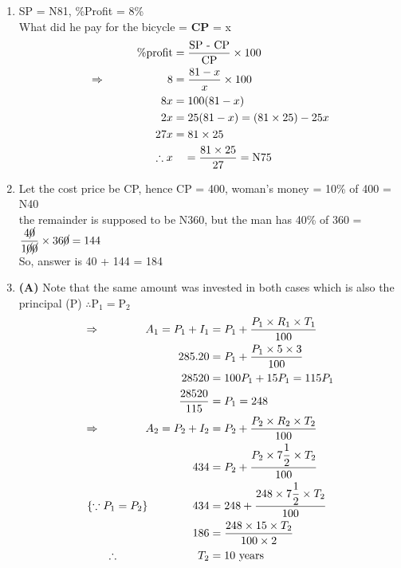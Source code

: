\begin{multicols}{2}
\begin{enumerate}[label={\arabic*.}]
    \item SP = N81, \%Profit = 8\% \\
    What did he pay for the bicycle = \textbf{CP} = x \\
    \begin{align*}
    \%\text{profit} &= \dfrac{ \text{SP - CP}}{\text{CP}} \times 100  \\ 
    \Rightarrow \hspace{55px} 8 &= \dfrac{81 - x }{x} \times 100 \\
     \hspace{50px} 8x &= 100(81 - x)  \\
     \hspace{50px} 2x &= 25(81 - x ) = (81\times25) -25x \\
     \hspace{50px} 27x &= 81\times 25 \\
    \therefore  x &\quad = \dfrac{81 \times 25}{27} = \text{N}75
    \end{align*}

    \item  Let the cost price be CP, hence CP = 400, woman's money = 10\% of 400 = N40 \\
    the remainder is supposed to be N360, but the man has 40\% of 360 = \(\dfrac{4\cancel{0}}{1\cancel{0}\cancel{0}} \times 36\cancel{0} = 144 \) \vspace {5px}\\
    So, answer is 40 + 144 = 184

    \item \textbf{(A)} Note that the same amount was invested in both cases which is also the principal (P) 
    \( \therefore \text{P}_1 = \text{P}_2\)
    \begin{align*} 
        \Rightarrow \hspace{40px} A_1 = P_1 + I_1 &= P_1 + \dfrac{P_1 \times R_1 \times T_1}{100} \\
        285.20&= P_1 + \dfrac{P_1 \times 5 \times 3}{100} \\
         28520 &= 100P_1 + 15P_1 = 115P_1 \\
         \dfrac{28520}{115}&= P_1 = 248 \\
        \Rightarrow \hspace{40px}  A_2 = P_2 + I_2 &= P_2 + \dfrac{P_2 \times R_2 \times T_2}{100} \\
        434&= P_2 + \dfrac{P_2 \times 7\dfrac{1}{2} \times T_2}{100} \\
        \{ \because P_1 = P_2\} \hspace{40px} 434&= 248 + \dfrac{248 \times 7\dfrac{1}{2} \times T_2}{100} \\
        186 &= \dfrac{248 \times 15 \times T_2}{100 \times 2} \\
        \therefore \hspace{70px} T_2 & = 10 \text{ years}
    \end{align*}
    

\end{enumerate}
\end{multicols}
